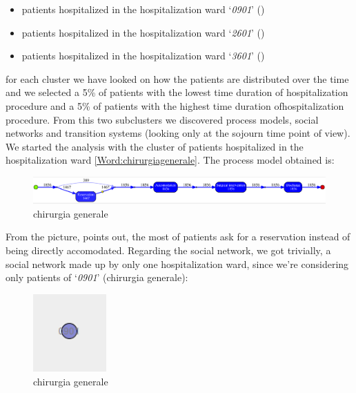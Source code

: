 \begin{itemize}
\item patients hospitalized in the hospitalization ward `\textit{0901}' () 
\item patients hospitalized in the hospitalization ward `\textit{2601}' ()
\item patients hospitalized in the hospitalization ward `\textit{3601}' ()
\end{itemize}
for each cluster we have looked on how the patients are distributed over the time and we selected a 5\% of patients with the lowest time duration of hospitalization procedure and a 5\% of patients with the highest time duration ofhospitalization procedure. From this two subclusters we discovered process models, social networks and transition systems (looking only at the sojourn time point of view).
\newline
We started the analysis with the cluster of patients hospitalized in the hospitalization ward \ref{Word:chirurgiagenerale}. The process model obtained is:
\begin{figure} [htbp]
\centering
\includegraphics[width=\textwidth, keepaspectratio]{RicoveriInductiveVisualMiner0901}
\caption{chirurgia generale}
\end{figure}
\newline
From the picture, points out, the most of patients ask for a reservation instead of being directly accomodated. Regarding the social network, we got trivially, a social network made up by only one hospitalization ward, since we're considering only patients of `\textit{0901}' (chirurgia generale): 
\begin{figure} [htbp]
\centering
\includegraphics[width=0.25\textwidth, keepaspectratio]{RicoveriSocialNetwork0901}
\caption{chirurgia generale}
\end{figure}
